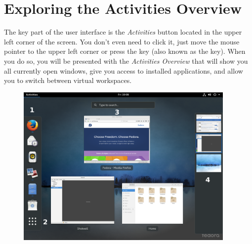 \section*{Exploring the Activities Overview}

The key part of the user interface is the \emph{Activities} button located in the upper left corner of the screen. You don't even need to click it, just move the mouse pointer to the upper left corner or press the  key (also known as the  key). When you do so, you will be presented with the \emph{Activities Overview} that will show you all currently open windows, give you access to installed applications, and allow you to switch between virtual workspaces.

\begin{figure}[ht]
\begin{center}
\includegraphics[width=0.95\textwidth]{img/shell-b}
 \label{fig:shell-b}
\end{center}
\end{figure}

